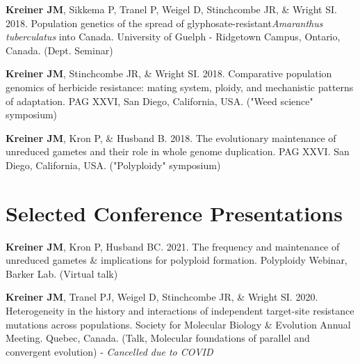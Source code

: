 \documentclass[12pt]{article}
\begin{document}
 \textbf{Kreiner JM}, Sikkema P, Tranel P, Weigel D, Stinchcombe JR, \& Wright SI. 2018. Population genetics of the spread of glyphosate-resistant\textit{Amaranthus tuberculatus} into Canada. University of Guelph - Ridgetown Campus, Ontario, Canada. (Dept. Seminar)

 \textbf{Kreiner JM}, Stinchcombe JR, \& Wright SI. 2018. Comparative population genomics of herbicide resistance: mating system, ploidy, and mechanistic patterns of adaptation. PAG XXVI, San Diego, California, USA. ("Weed science" symposium)

 \textbf{Kreiner JM}, Kron P, \& Husband B. 2018. The evolutionary maintenance of unreduced gametes and their role in whole genome duplication. PAG XXVI. San Diego, California, USA. ("Polyploidy" symposium)


\section*{Selected Conference Presentations}



  \textbf{Kreiner JM}, Kron P, Husband BC. 2021. The frequency and maintenance of unreduced gametes \& implications for polyploid formation. Polyploidy Webinar, Barker Lab. (Virtual talk)

  \textbf{Kreiner JM}, Tranel PJ, Weigel D, Stinchcombe JR, \& Wright SI. 2020. Heterogeneity in the history and interactions of independent target-site resistance mutations across populations. Society for Molecular Biology \& Evolution Annual Meeting. Quebec, Canada. (Talk, Molecular foundations of parallel and convergent evolution) -\textit{ Cancelled due to COVID}
\end{document}
